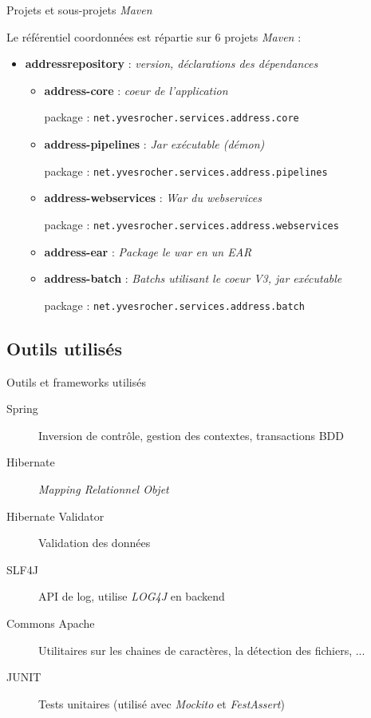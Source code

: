 \documentclass[compact]{beamer}%
\begin{document}
\begin{frame}{Projets et sous-projets \emph{Maven}}
	
	Le référentiel coordonnées est répartie sur 6 projets \emph{Maven} :
	\begin{itemize}[<+->]
	\item \textbf{addressrepository} : \emph{version, déclarations des dépendances}
		\begin{itemize}
		\item \textbf{address-core} : \emph{coeur de l'application}\par
		package : \texttt{net.yvesrocher.services.address.core}
		\item \textbf{address-pipelines} : \emph{Jar exécutable (démon)}\par
		package : \texttt{net.yvesrocher.services.address.pipelines}
		\item \textbf{address-webservices} : \emph{War du webservices}\par
		package : \texttt{net.yvesrocher.services.address.webservices}
		\item \textbf{address-ear} : \emph{Package le war en un EAR}
		\item \textbf{address-batch} : \emph{Batchs utilisant le coeur V3, jar exécutable}\par
		package : \texttt{net.yvesrocher.services.address.batch}
		\end{itemize}
	\end{itemize}

\end{frame}

\subsection{Outils utilisés}

\begin{frame}{Outils et frameworks utilisés}

	\begin{description}
	\item[Spring] Inversion de contrôle, gestion des contextes, transactions BDD
	\item[Hibernate] \emph{Mapping Relationnel Objet}
	\item[Hibernate Validator] Validation des données
	\item[SLF4J] API de log, utilise \emph{LOG4J} en backend
	\item[Commons Apache] Utilitaires sur les chaines de caractères, la détection des fichiers, ...
	\item[JUNIT] Tests unitaires (utilisé avec \emph{Mockito} et \emph{FestAssert})
	\end{description}
	
\end{frame}
\end{document}
